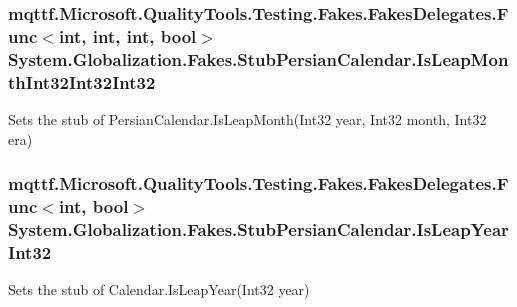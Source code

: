\hypertarget{class_system_1_1_globalization_1_1_fakes_1_1_stub_persian_calendar_a9f4ec23d433faa6be7ff8cf0716b16e1}{
\subsubsection[{Is\-Leap\-Month\-Int32\-Int32\-Int32}]{\setlength{\rightskip}{0pt plus 5cm}mqttf.\-Microsoft.\-Quality\-Tools.\-Testing.\-Fakes.\-Fakes\-Delegates.\-Func$<$int, int, int, bool$>$ System.\-Globalization.\-Fakes.\-Stub\-Persian\-Calendar.\-Is\-Leap\-Month\-Int32\-Int32\-Int32}}\label{class_system_1_1_globalization_1_1_fakes_1_1_stub_persian_calendar_a9f4ec23d433faa6be7ff8cf0716b16e1}


Sets the stub of Persian\-Calendar.\-Is\-Leap\-Month(\-Int32 year, Int32 month, Int32 era)

\hypertarget{class_system_1_1_globalization_1_1_fakes_1_1_stub_persian_calendar_a2aaa4eb7f28956310ab80e9078cc5d40}{
\subsubsection[{Is\-Leap\-Year\-Int32}]{\setlength{\rightskip}{0pt plus 5cm}mqttf.\-Microsoft.\-Quality\-Tools.\-Testing.\-Fakes.\-Fakes\-Delegates.\-Func$<$int, bool$>$ System.\-Globalization.\-Fakes.\-Stub\-Persian\-Calendar.\-Is\-Leap\-Year\-Int32}}\label{class_system_1_1_globalization_1_1_fakes_1_1_stub_persian_calendar_a2aaa4eb7f28956310ab80e9078cc5d40}


Sets the stub of Calendar.\-Is\-Leap\-Year(\-Int32 year)

